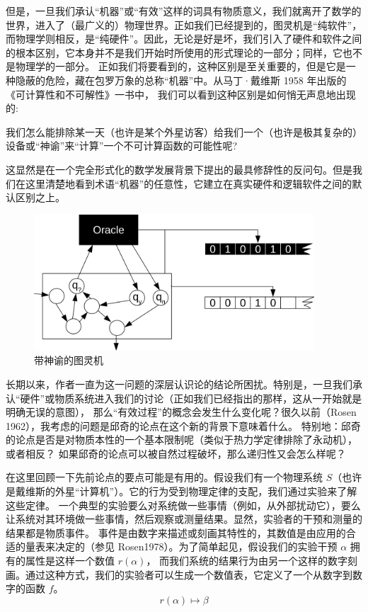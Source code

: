 \documentclass[a4paper,12pt]{article}
\begin{document}
但是，一旦我们承认“机器”或“有效”这样的词具有物质意义，我们就离开了数学的世界，进入了（最广义的）物理世界。正如我们已经提到的，图灵机是“纯软件”，
而物理学则相反，是“纯硬件”。因此，无论是好是坏，我们引入了硬件和软件之间的根本区别，它本身并不是我们开始时所使用的形式理论的一部分；同样，它也不是物理学的一部分。
正如我们将要看到的，这种区别是至关重要的，但是它是一种隐蔽的危险，藏在包罗万象的总称“机器”中。从马丁·戴维斯 1958 年出版的《可计算性和不可解性》一书中，
我们可以看到这种区别是如何悄无声息地出现的:

\begin{displayquote}
    我们怎么能排除某一天（也许是某个外星访客）给我们一个（也许是极其复杂的）设备或“神谕”来“计算”一个不可计算函数的可能性呢?
\end{displayquote}

这显然是在一个完全形式化的数学发展背景下提出的最具修辞性的反问句。但是我们在这里清楚地看到术语“机器”的任意性，它建立在真实硬件和逻辑软件之间的默认区别之上。

\begin{figure}[ht]
\centering
\includegraphics[height=2.0in]{images/turing_machine_oracle.png}
\caption{带神谕的图灵机}
\end{figure}

长期以来，作者一直为这一问题的深层认识论的结论所困扰。特别是，一旦我们承认“硬件”或物质系统进入我们的讨论（正如我们已经指出的那样，这从一开始就是明确无误的意图），
那么“有效过程”的概念会发生什么变化呢？很久以前（Rosen 1962），我考虑的问题是邱奇的论点在这个新的背景下意味着什么。
特别地：邱奇的论点是否是对物质本性的一个基本限制呢（类似于热力学定律排除了永动机），或者相反？ 如果邱奇的论点可以被自然过程破坏，那么递归性又会怎么样呢？

在这里回顾一下先前论点的要点可能是有用的。假设我们有一个物理系统 $S$（也许是戴维斯的外星“计算机”）。它的行为受到物理定律的支配，我们通过实验来了解这些定律。
一个典型的实验要么对系统做一些事情（例如，从外部扰动它），要么让系统对其环境做一些事情，然后观察或测量结果。显然，实验者的干预和测量的结果都是物质事件。
事件是由数字来描述或刻画其特性的，其数值是由应用的合适的量表来决定的（参见 Rosen1978）。为了简单起见，假设我们的实验干预 $\alpha$ 拥有的属性是这样一个数值 $r(\alpha)$，
而我们系统的结果行为由另一个这样的数字刻画。通过这种方式，我们的实验者可以生成一个数值表，它定义了一个从数字到数字的函数 $f$。
$$
r(\alpha) \mapsto \beta
$$
\end{document}

